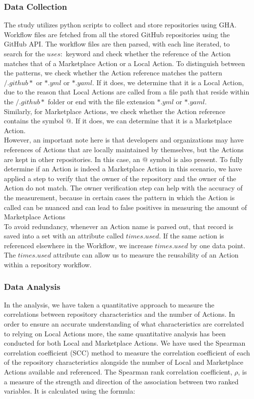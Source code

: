 \documentclass[conference]{IEEEtran}
\begin{document}
          \subsubsection{\textbf{Data Collection}}
            The study utilizes python scripts\cite{Marof2024}  to collect and store repositories using GHA. Workflow files are fetched from all the stored GitHub repositories using the GitHub API.  The workflow files are then parsed, with each line iterated, to search for the $uses:$ keyword and check whether the reference of the Action matches that of a Marketplace Action or a Local Action. To distinguish between the patterns, we check whether the Action reference matches the pattern $/.github*$ or $*.yml$ or $*.yaml$. If it does, we determine that it is a Local Action, due to the reason that Local Actions are called from a file path that reside within the $/.github*$ folder or end with the file extension $*.yml$ or $*.yaml$.
            \\ Similarly, for Marketplace Actions, we check whether the Action reference contains the symbol $@$. If it does, we can determine that it is a Marketplace Action. \\ However, an important note here is that developers and organizations may have references of Actions that are locally maintained by themselves, but the Actions are kept in other repositories. In this case, an $@$ symbol is also present. To fully determine if an Action is indeed a Marketplace Action in this scenario, we have applied a step to verify that the owner of the repository and the owner of the Action do not match. The owner verification step can help with the accuracy of the measurement, because in certain cases the pattern in which the Action is called can be nuanced and can lead to false positives in measuring the amount of Marketplace Actions\\ 
            To avoid redundancy, whenever an Action name is parsed out, that record is saved into a set with an attribute called $times.used$. If the same action is referenced elsewhere in the Workflow, we increase $times.used$ by one data point. The $times.used$ attribute can allow us to measure the reusability of an Action within a repository workflow.\\

          \subsubsection{\textbf{Data Analysis}}
            In the analysis, we have taken a quantitative approach to measure the correlations between repository characteristics and the number of Actions. In order to ensure an accurate understanding of what characteristics are correlated to relying on Local Actions more, the same quantitative analysis has been conducted for both Local and Marketplace Actions. We have used the Spearman correlation coefficient (SCC) method to measure the correlation coefficient of each of the repository characteristics alongside the number of Local and Marketplace Actions available and referenced. The Spearman rank correlation coefficient, \(\rho\), is a measure of the strength and direction of the association between two ranked variables. It is calculated using the formula:
\end{document}
